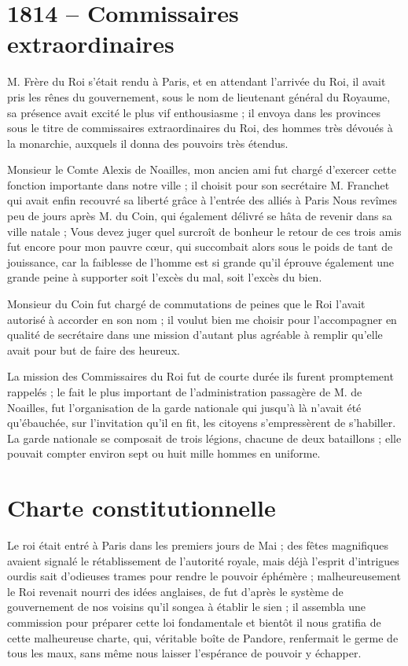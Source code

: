 \documentclass[11pt,a4paper]{report}
\begin{document}
\section*{1814 -- Commissaires extraordinaires}

M. Frère du Roi s'était rendu à Paris, et en attendant l'arrivée du Roi, il avait pris les rênes du gouvernement, sous le nom de lieutenant général du Royaume, sa présence avait excité le plus vif enthousiasme ; il envoya dans les provinces sous le titre de commissaires extraordinaires du Roi, des hommes très dévoués à la monarchie, auxquels il donna des pouvoirs très étendus.

Monsieur le Comte Alexis de Noailles, mon ancien ami fut chargé d'exercer cette fonction importante dans notre ville ; il choisit pour son secrétaire M. Franchet qui avait enfin recouvré sa liberté grâce à l'entrée des alliés à Paris Nous revîmes peu de jours après M. du Coin, qui également délivré se hâta de revenir dans sa ville natale ; Vous devez juger quel surcroît de bonheur le retour de ces trois amis fut encore pour mon pauvre cœur, qui succombait alors sous le poids de tant de jouissance, car la faiblesse de l'homme est si grande qu'il éprouve également une grande peine à supporter soit l'excès du mal, soit l'excès du bien.

Monsieur du Coin fut chargé de commutations de peines que le Roi l'avait autorisé à accorder en son nom ; il voulut bien me choisir pour l'accompagner en qualité de secrétaire dans une mission d'autant plus agréable à remplir qu'elle avait pour but de faire des heureux.

La mission des Commissaires du Roi fut de courte durée ils furent promptement rappelés ; le fait le plus important de l'administration passagère de M. de Noailles, fut l'organisation de la garde nationale qui jusqu'à là n'avait été qu'ébauchée, sur l'invitation qu'il en fit, les citoyens s'empressèrent de s'habiller. La garde nationale se composait de trois légions, chacune de deux bataillons ; elle pouvait compter environ sept ou huit mille hommes en uniforme.

\section*{Charte constitutionnelle}

Le roi était entré à Paris dans les premiers jours de Mai ; des fêtes magnifiques avaient signalé le rétablissement de l'autorité royale, mais déjà l'esprit d'intrigues ourdis sait d'odieuses trames pour rendre le pouvoir éphémère ; malheureusement le Roi revenait nourri des idées anglaises, de fut d'après le système de gouvernement de nos voisins qu'il songea à établir le sien ; il assembla une commission pour préparer cette loi fondamentale et bientôt il nous gratifia de cette malheureuse charte, qui, véritable boîte de Pandore, renfermait le germe de tous les maux, sans même nous laisser l'espérance de pouvoir y échapper.
\end{document}
